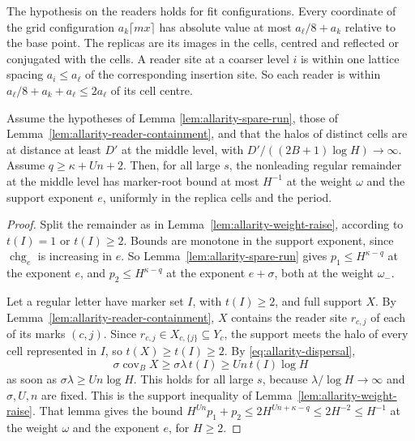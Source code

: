 The hypothesis on the readers holds for fit configurations. Every coordinate of
the grid configuration $a_k\lceil mx\rceil$ has absolute value at most
$a_\ell/8+a_k$ relative to the base point. The replicas are its images in
the cells, centred and reflected or conjugated with the cells. A reader
site at a coarser level $i$ is within one lattice spacing $a_i\le a_\ell$
of the corresponding insertion site. So each reader is within
$a_\ell/8+a_k+a_\ell\le2a_\ell$ of its cell centre.

\begin{lemma}
\label{lem:allarity-remainder-restored}
Assume the hypotheses of Lemma \ref{lem:allarity-spare-run}, those of
Lemma~\ref{lem:allarity-reader-containment},
and that the halos of distinct cells are at distance at least $D'$ at the
middle level, with $D'/((2B+1)\log H)\to\infty$. Assume
$q\ge\kappa+Un+2$. Then, for all large $s$, the nonleading regular
remainder at the middle level has marker-root bound at most $H^{-1}$ at
the weight $\omega$ and the support exponent $e$, uniformly in the replica
cells and the period.
\end{lemma}
\begin{proof}
Split the remainder as in Lemma~\ref{lem:allarity-weight-raise}, according
to $t(I)=1$ or $t(I)\ge2$. Bounds are monotone in the support exponent,
since $\operatorname{chg}_e$ is increasing in $e$. So
Lemma~\ref{lem:allarity-spare-run} gives $p_1\le
H^{\kappa-q}$ at the exponent $e$, and $p_2\le H^{\kappa-q}$ at the
exponent $e+\sigma$, both at the weight $\omega_-$.

Let a regular letter have marker set $I$, with $t(I)\ge2$, and full
support $X$. By Lemma~\ref{lem:allarity-reader-containment}, $X$ contains
the reader site $r_{c,j}$ of each of its marks $(c,j)$. Since
$r_{c,j}\in X_{c,\{j\}}\subseteq Y_c$, the support meets the halo of every
cell represented in $I$, so $t(X)\ge t(I)\ge2$. By
\eqref{eq:allarity-dispersal},
\[
 \sigma\operatorname{cov}_BX\ge\sigma\lambda\,t(I)\ge Un\,t(I)\log H
\]
as soon as $\sigma\lambda\ge Un\log H$. This holds for all large $s$,
because $\lambda/\log H\to\infty$ and $\sigma,U,n$ are fixed. This is the
support inequality of Lemma~\ref{lem:allarity-weight-raise}. That lemma
gives the bound $H^{Un}p_1+p_2\le2H^{Un+\kappa-q}\le2H^{-2}\le H^{-1}$ at
the weight $\omega$ and the exponent $e$, for $H\ge2$.
\end{proof}

